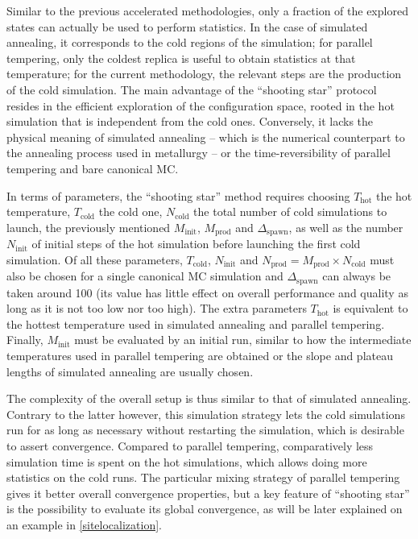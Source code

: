\documentclass[main.tex]{subfiles}
\begin{document}
Similar to the previous accelerated methodologies, only a fraction of the explored states can actually be used to perform statistics. In the case of simulated annealing, it corresponds to the cold regions of the simulation; for parallel tempering, only the coldest replica is useful to obtain statistics at that temperature; for the current methodology, the relevant steps are the production of the cold simulation. The main advantage of the ``shooting star'' protocol resides in the efficient exploration of the configuration space, rooted in the hot simulation that is independent from the cold ones. Conversely, it lacks the physical meaning of simulated annealing -- which is the numerical counterpart to the annealing process used in metallurgy -- or the time-reversibility of parallel tempering and bare canonical MC. 

In terms of parameters, the ``shooting star'' method requires choosing $T_\text{hot}$ the hot temperature, $T_\text{cold}$ the cold one, $N_\text{cold}$ the total number of cold simulations to launch, the previously mentioned $M_\text{init}$, $M_\text{prod}$ and $\Delta_\text{spawn}$, as well as the number $N_\text{init}$ of initial steps of the hot simulation before launching the first cold simulation. Of all these parameters, $T_\text{cold}$, $N_\text{init}$ and $N_\text{prod} = M_\text{prod}\times N_\text{cold}$ must also be chosen for a single canonical MC simulation and $\Delta_\text{spawn}$ can always be taken around 100 (its value has little effect on overall performance and quality as long as it is not too low nor too high). The extra parameters $T_\text{hot}$ is equivalent to the hottest temperature used in simulated annealing and parallel tempering. Finally, $M_\text{init}$ must be evaluated by an initial run, similar to how the intermediate temperatures used in parallel tempering are obtained or the slope and plateau lengths of simulated annealing are usually chosen.

The complexity of the overall setup is thus similar to that of simulated annealing. Contrary to the latter however, this simulation strategy lets the cold simulations run for as long as necessary without restarting the simulation, which is desirable to assert convergence. Compared to parallel tempering, comparatively less simulation time is spent on the hot simulations, which allows doing more statistics on the cold runs. The particular mixing strategy of parallel tempering gives it better overall convergence properties, but a key feature of ``shooting star'' is the possibility to evaluate its global convergence, as will be later explained on an example in \cref{sitelocalization}.
\end{document}
